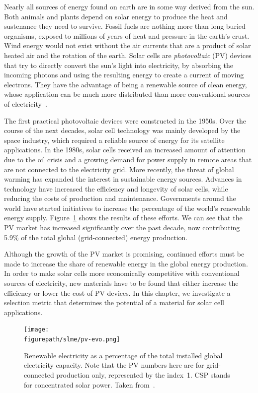 \begin{refsection}
Nearly all sources of energy found on earth are in some way derived from the 
sun. Both animals and plants depend on solar energy to produce the heat and 
sustenance they need to survive. Fossil fuels are nothing more than long 
buried organisms, exposed to millions of years of heat and pressure in the 
earth's crust. Wind energy would not exist without the air currents that are a 
product of solar heated air and the rotation of the earth. Solar cells are 
\textit{photovoltaic} (PV) devices that try to directly convert the sun's 
light into electricity, by absorbing the incoming photons and using the 
resulting energy to create a current of moving electrons. They have the 
advantage of being a renewable source of clean energy, whose application can 
be much more distributed than more conventional sources of 
electricity~\cite{Marsden2011}. 
 
The first practical photovoltaic devices were constructed in the 1950s. Over 
the course of the next decades, solar cell technology was mainly developed by 
the space industry, which required a reliable source of energy for its 
satellite applications. In the 1980s, solar cells received an increased amount 
of attention due to the oil crisis and a growing demand for power supply in 
remote areas that are not connected to the electricity grid. More recently, 
the threat of global warming has expanded the interest in sustainable energy 
sources. Advances in technology have increased the efficiency and longevity of 
solar cells, while reducing the costs of production and maintenance. 
Governments around the world have started initiatives to increase the 
percentage of the world's renewable energy supply. 
Figure~\ref{slme:fig-pv_evo} shows the results of these efforts. We can see 
that the PV market has increased significantly over the past decade, now 
contributing 5.9\% of the total global (grid-connected) energy production. 
 
Although the growth of the PV market is promising, continued efforts must be 
made to increase the share of renewable energy in the global energy 
production. In order to make solar cells more economically competitive with 
conventional sources of electricity, new materials have to be found that 
either increase the efficiency or lower the cost of PV devices. In this 
chapter, we investigate a selection metric that determines the potential of a 
material for solar cell applications. 
 
\begin{figure}[hb]  
\centering 
\texttt{[image: \\figurepath/slme/pv-evo.png]} 
\caption{Renewable electricity as a percentage of the total installed global 
electricity capacity. Note that the PV numbers here are for grid-connected production only, represented by the index~1. CSP stands for concentrated solar power. Taken from~\cite{NREL2017}.} 
\label{slme:fig-pv_evo}  
\end{figure} 


\end{refsection}
